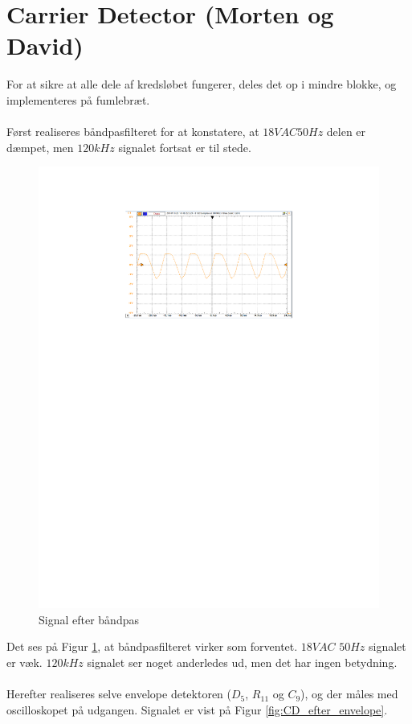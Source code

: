\section{Carrier Detector (Morten og David)}
For at sikre at alle dele af kredsløbet fungerer, deles det op i mindre blokke, og implementeres på fumlebræt.\\
\\
Først realiseres båndpasfilteret for at konstatere, at $18 VAC 50 Hz$ delen er dæmpet, men $120 kHz$ signalet fortsat er til stede.

\begin{figure}[h]
	\centering
	\includegraphics[width={\textwidth},trim=150 520 150 80, clip=true]{../Implementering/billeder/efter_baandpas.pdf}
	\caption{Signal efter båndpas}
	\label{fig:CD_efter_baandpas}
\end{figure}

Det ses på Figur \ref{fig:CD_efter_baandpas}, at båndpasfilteret virker som forventet. $18 VAC$ $50 Hz$ signalet er væk. $120 kHz$ signalet ser noget anderledes ud, men det har ingen betydning.\\
\\
Herefter realiseres selve envelope detektoren ($D_{5}$\cite{lib:1N4148}, $R_{11}$ og $C_{9}$), og der måles med oscilloskopet på udgangen. Signalet er vist på Figur \ref{fig:CD_efter_envelope}.

